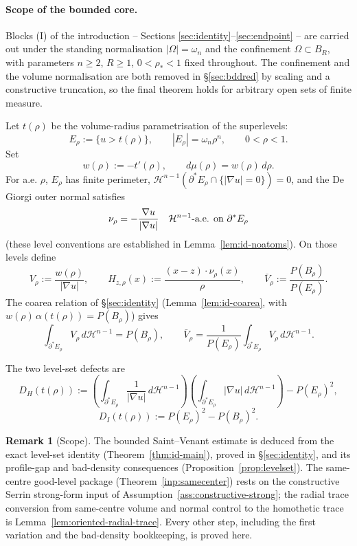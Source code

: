 \documentclass[11pt]{amsart}
\theoremstyle{definition}
\newtheorem{remark}[theorem]{Remark}
\newcommand{\Om}{\Omega}
\newcommand{\rstar}{\rho_*}
\newcommand{\wt}{w}
\newcommand{\Hn}{\mathcal H^{n-1}}
\newcommand{\Per}{P}
\begin{document}
\paragraph{Scope of the bounded core.}  Blocks (I) of the introduction --
Sections \ref{sec:identity}--\ref{sec:endpoint} -- are carried out under the
standing normalisation \(|\Om|=\omega_n\) and the confinement
\(\Om\subset B_R\), with parameters \(n\ge2\), \(R\ge1\), \(0<\rstar<1\) fixed
throughout.  The confinement and the volume normalisation are both removed in
\S\ref{sec:bddred} by scaling and a constructive truncation, so the final
theorem holds for arbitrary open sets of finite measure.

Let \(t(\rho)\) be the volume-radius parametrisation of the superlevels:
\[
   E_\rho:=\{u>t(\rho)\},\qquad |E_\rho|=\omega_n\rho^n,
   \qquad 0<\rho<1.
\]
Set
\[
   \wt(\rho):=-t'(\rho),\qquad d\mu(\rho)=\wt(\rho)\,d\rho.
\]
For a.e. \(\rho\), \(E_\rho\) has finite perimeter, \(\Hn(\partial^*E_\rho
\cap\{|\nabla u|=0\})=0\), and the De Giorgi outer normal satisfies
\[
   \nu_\rho=-\frac{\nabla u}{|\nabla u|}
   \quad\Hn\hbox{-a.e. on }\partial^*E_\rho
\]
(these level conventions are established in
Lemma~\ref{lem:id-noatoms}).  On those levels define
\[
   V_\rho:=\frac{\wt(\rho)}{|\nabla u|},\qquad
   H_{z,\rho}(x):=\frac{(x-z)\cdot\nu_\rho(x)}{\rho},\qquad
   \bar V_\rho:=\frac{\Per(B_\rho)}{\Per(E_\rho)}.
\]
The coarea relation of \S\ref{sec:identity}
(Lemma~\ref{lem:id-coarea}, with \(\wt(\rho)\,\alpha(t(\rho))=\Per(B_\rho)\))
gives
\begin{equation}\label{eq:V-mean}
   \int_{\partial^*E_\rho} V_\rho\,d\Hn=\Per(B_\rho),
   \qquad
   \bar V_\rho=\frac1{\Per(E_\rho)}
       \int_{\partial^*E_\rho}V_\rho\,d\Hn .
\end{equation}

The two level-set defects are
\[
   D_H(t(\rho))
   :=\left(\int_{\partial^*E_\rho}\frac1{|\nabla u|}\,d\Hn\right)
     \left(\int_{\partial^*E_\rho}|\nabla u|\,d\Hn\right)
      -\Per(E_\rho)^2,
\]
\[
   D_I(t(\rho)):=\Per(E_\rho)^2-\Per(B_\rho)^2 .
\]

\begin{remark}[Scope]\label{rem:scope}
The bounded Saint--Venant estimate is deduced from the exact level-set
identity (Theorem~\ref{thm:id-main}), proved in \S\ref{sec:identity}, and its
profile-gap and bad-density consequences (Proposition~\ref{prop:levelset}).
The same-centre good-level package (Theorem~\ref{inp:samecenter}) rests on the
constructive Serrin strong-form input of Assumption~\ref{ass:constructive-strong};
the radial trace conversion from same-centre volume and normal control to the
homothetic trace is Lemma~\ref{lem:oriented-radial-trace}.  Every other step,
including the first variation and the bad-density bookkeeping, is proved here.
\end{remark}
\end{document}
